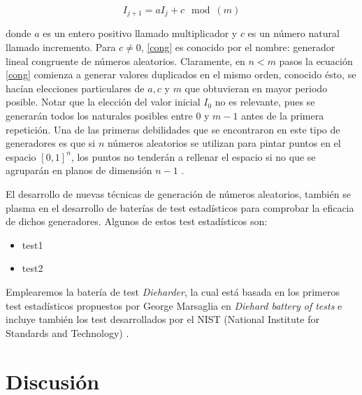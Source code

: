 \documentclass[../proyecto.tex]{memoir}
\begin{document}
\begin{equation} \label{cong}
I_{j+1} = aI_{j} +c \mod (m)
\end{equation}

donde $a$ es un entero positivo llamado multiplicador y $c$ es un número natural llamado incremento. Para $c \neq 0$, \ref{cong} es conocido por el nombre: generador lineal congruente de números aleatorios. Claramente, en $n<m$ pasos la ecuación \ref{cong} comienza a generar valores duplicados en el mismo orden, conocido ésto, se hacían elecciones particulares de $a,c$ y $m$ que obtuvieran en mayor periodo posible. Notar que la elección del valor inicial $I_{0}$ no es relevante, pues se generarán todos los naturales posibles entre $0$ y $m-1$ antes de la primera repetición. Una de las primeras debilidades que se encontraron en este tipo de generadores es que si $n$ números aleatorios se utilizan para pintar puntos en el espacio $[0,1]^{n}$, los puntos no tenderán a rellenar el espacio si no que se agruparán en planos de dimensión $n-1$ \cite{planos}. 

El desarrollo de nuevas técnicas de generación de números aleatorios, también se plasma en el desarrollo de baterías de test estadísticos para comprobar la eficacia de dichos generadores. Algunos de estos test estadísticos son:

\begin{itemize}
\item test1
\item test2
\end{itemize}

Emplearemos la batería de test \textit{Dieharder}, la cual está basada en los primeros test estadísticos propuestos por George Marsaglia en \textit{Diehard battery of tests} e incluye también los test desarrollados por el NIST (National Institute for Standards and Technology) \cite{dieharder}.

\section{Discusión}
\end{document}
